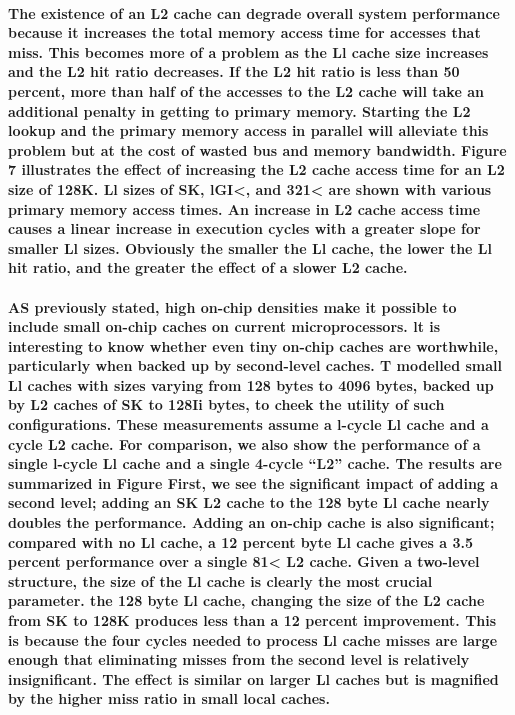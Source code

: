 \documentclass{article}
\begin{document}
\paragraph{The existence of an L2 cache can degrade overall system performance
 because it increases the total memory access time for accesses that miss.
  This becomes more of a problem as the Ll cache size increases and the L2
   hit ratio decreases. If the L2 hit ratio is less than 50 percent, more 
   than half of the accesses to the L2 cache will take an additional penalty 
   in getting to primary memory. Starting the L2 lookup and the primary memory 
   access in parallel will alleviate this problem but at the cost of wasted bus
    and memory bandwidth. Figure 7 illustrates the effect of increasing the L2 
    cache access time for an L2 size of 128K. Ll sizes of SK, lGI<, and 321< are 
    shown with various primary memory access times. An increase in L2 cache access
     time causes a linear increase in execution cycles with a greater slope for smaller
      Ll sizes. Obviously the smaller the Ll cache, the lower the Ll hit ratio,
       and the greater the effect of a slower L2 cache. }

\paragraph{AS previously stated, high on-chip densities make it
 possible to include small on-chip caches on current microprocessors.
  lt is interesting to know whether even tiny on-chip caches are worthwhile, 
  particularly when backed up by second-level caches. T modelled small Ll 
  caches with sizes varying from 128 bytes to 4096 bytes, backed up by L2 caches 
  of SK to 128Ii bytes, to cheek the utility of such configurations. These measurements 
  assume a l-cycle Ll cache and a cycle L2 cache. For comparison, we also show 
  the performance of a single l-cycle Ll cache and a single 4-cycle “L2” cache.
   The results are summarized in Figure  First, we see the significant impact of 
   adding a second level; adding an SK L2 cache to the 128 byte Ll cache nearly doubles
    the performance. Adding an on-chip cache is also significant; compared with no Ll 
    cache, a 12 percent byte Ll cache gives a 3.5 percent performance over a single 81< L2 cache. 
    Given a two-level structure, the size of the Ll cache is clearly the most crucial parameter. 
   the  128 byte Ll cache, changing the size of the L2 cache from SK to 128K produces less 
    than a 12 percent improvement. This is because the four cycles needed to process Ll cache misses
     are large enough that eliminating misses from the second level is relatively insignificant.
      The effect is similar on larger Ll caches but is magnified by the higher miss ratio in small local caches. }
\end{document}
